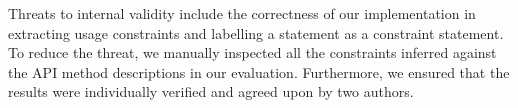 Threats to internal validity include the correctness of our implementation in extracting usage constraints and labelling a statement as a constraint statement. To reduce the threat, we manually inspected all the constraints inferred against the API method descriptions in our evaluation. Furthermore, we ensured that the results were individually verified and agreed
upon by two authors.
